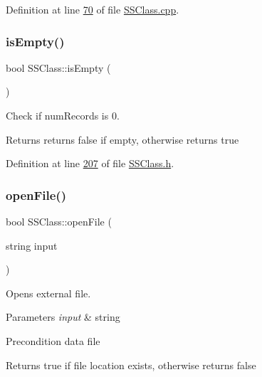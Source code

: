 Definition at line \hyperlink{SSClass_8cpp_source_l00070}{70} of file \hyperlink{SSClass_8cpp_source}{S\+S\+Class.\+cpp}.

\mbox{\label{classSSClass_afc95611385e4d389818332414d5c491c}} 
\subsubsection{\texorpdfstring{is\+Empty()}{isEmpty()}}
{\footnotesize\ttfamily bool S\+S\+Class\+::is\+Empty (\begin{DoxyParamCaption}{ }\end{DoxyParamCaption})\hspace{0.3cm}{\ttfamily [inline]}}



Check if num\+Records is 0. 

\begin{DoxyReturn}{Returns}
returns false if empty, otherwise returns true 
\end{DoxyReturn}


Definition at line \hyperlink{SSClass_8h_source_l00207}{207} of file \hyperlink{SSClass_8h_source}{S\+S\+Class.\+h}.

\mbox{\label{classSSClass_a92e012441608ea36f3013fb3cbea9da8}} 
\subsubsection{\texorpdfstring{open\+File()}{openFile()}}
{\footnotesize\ttfamily bool S\+S\+Class\+::open\+File (\begin{DoxyParamCaption}\item[{string}]{input }\end{DoxyParamCaption})}



Opens external file. 


\begin{DoxyParams}{Parameters}
{\em input} & string \\
\hline
\end{DoxyParams}
\begin{DoxyPrecond}{Precondition}
data file 
\end{DoxyPrecond}
\begin{DoxyReturn}{Returns}
true if file location exists, otherwise returns false 
\end{DoxyReturn}


